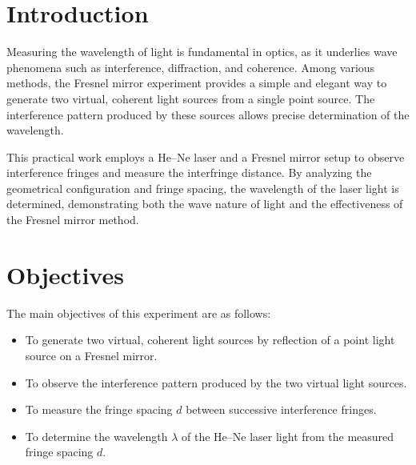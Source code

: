 \documentclass[12pt,a4paper,twoside]{article}
\begin{document}
\pagestyle{plain}

\setcounter{page}{1}



\begin{abstract}
This practical work investigates the interference phenomenon produced by a Fresnel mirror using a He--Ne laser source. 
The experimental setup allows the creation of two virtual, coherent light sources by reflection on two slightly inclined plane mirrors. 
The resulting interference fringes are observed on a screen, and the interfringe distance is measured. 
By analyzing the geometrical parameters and the fringe spacing, the wavelength of the laser light is determined. 
The measured wavelength is found to be approximately $\lambda \approx 6.3 \times 10^{-7}\,\text{m}$, in good agreement with the theoretical wavelength of the He--Ne laser, confirming the validity of the Fresnel mirror method.
\end{abstract}



\tableofcontents


\newpage 



\section{Introduction}

Measuring the wavelength of light is fundamental in optics, as it underlies wave phenomena such as interference, diffraction, and coherence. Among various methods, the Fresnel mirror experiment provides a simple and elegant way to generate two virtual, coherent light sources from a single point source. The interference pattern produced by these sources allows precise determination of the wavelength. 

This practical work employs a He--Ne laser and a Fresnel mirror setup to observe interference fringes and measure the interfringe distance. By analyzing the geometrical configuration and fringe spacing, the wavelength of the laser light is determined, demonstrating both the wave nature of light and the effectiveness of the Fresnel mirror method.



\section{Objectives}
The main objectives of this experiment are as follows:
\begin{itemize}
    \item To generate two virtual, coherent light sources by reflection of a point light source on a Fresnel mirror.
    \item To observe the interference pattern produced by the two virtual light sources.
    \item To measure the fringe spacing $d$ between successive interference fringes.
    \item To determine the wavelength $\lambda$ of the He--Ne laser light from the measured fringe spacing $d$.
\end{itemize}
\end{document}
